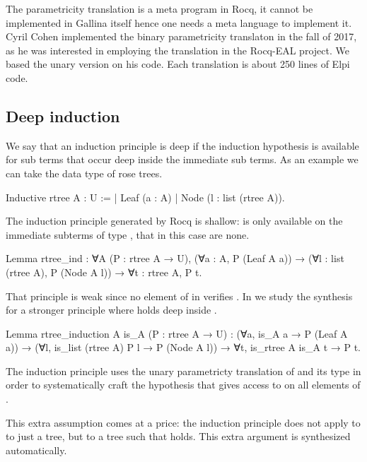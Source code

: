 \documentclass[a4paper, 11pt]{book}
\begin{document}
The parametricity translation is a meta program in Rocq, it cannot be implemented in
Gallina itself hence one needs a meta language to implement it.
Cyril Cohen implemented the binary parametricity translaton in the fall of 2017,
as he was interested in employing the translation in the Rocq-EAL project.
We based the unary version on his code. Each translation is about 250 lines
of Elpi code.

\subsection{Deep induction}

We say that an induction principle is deep if the induction hypothesis is
available for sub terms that occur deep inside the immediate sub terms.
As an example we can take the data type of rose trees.

\begin{rocqcode}
Inductive rtree A : U :=
| Leaf (a : A)
| Node (l : list (rtree A)).
\end{rocqcode}

The induction principle generated by Rocq is shallow:  is
only available on the immediate subterms of type , that
in this case are none.

\begin{rocqcode}
Lemma rtree_ind : ∀A (P : rtree A → U),
  (∀a : A, P (Leaf A a)) →
  (∀l : list (rtree A), P (Node A l)) →
  ∀t : rtree A, P t.
\end{rocqcode}

That principle is weak since no element of  in 
verifies . In \cite{tassi:hal-01897468} we study the synthesis
for a stronger principle where  holds deep inside .

\begin{rocqcode}
Lemma rtree_induction A is_A (P : rtree A → U) :
  (∀a, is_A a → P (Leaf A a)) →
  (∀l, is_list (rtree A) P l → P (Node A l)) →
     ∀t, is_rtree A is_A t → P t.
\end{rocqcode}

The induction principle uses the unary parametricty
translation of  and its type in order to systematically craft
the hypothesis  that gives access to
 on all elements of .

This  extra assumption comes at a price: the induction principle does not apply
to to just a tree, but to a tree  such that
 holds. This extra argument is
synthesized automatically.
\end{document}
